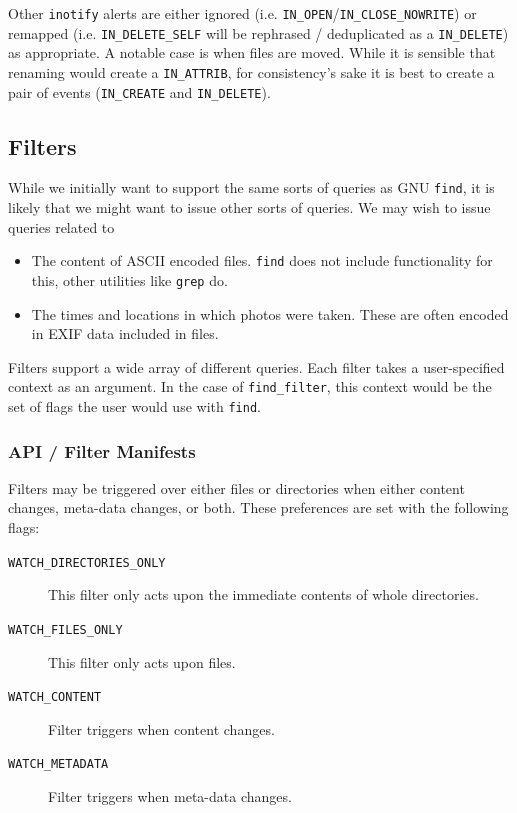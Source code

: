 \documentclass[a4paper]{report}
\newcommand{\inlinecode}{\texttt}
\begin{document}
Other \inlinecode{inotify} alerts are either ignored (i.e. \inlinecode{IN\_OPEN}/\inlinecode{IN\_CLOSE\_NOWRITE}) or remapped (i.e. \inlinecode{IN\_DELETE\_SELF} will be rephrased / deduplicated as a \inlinecode{IN\_DELETE}) as appropriate. A notable case is when files are moved. While it is sensible that renaming would create a \inlinecode{IN\_ATTRIB}, for consistency's sake it is best to create a pair of events (\inlinecode{IN\_CREATE} and \inlinecode{IN\_DELETE}).

\subsection{Filters}

While we initially want to support the same sorts of queries as GNU \inlinecode{find}, it is likely that we might want to issue other sorts of queries. We may wish to issue queries related to
\begin{itemize}
\item The content of ASCII encoded files. \inlinecode{find} does not include functionality for this, other utilities like \inlinecode{grep} do.
\item The times and locations in which photos were taken. These are often encoded in EXIF data included in files.
\end{itemize}

Filters support a wide array of different queries. Each filter takes a user-specified context as an argument. In the case of \inlinecode{find\_filter}, this context would be the set of flags the user would use with \inlinecode{find}.

\subsubsection{API / Filter Manifests}

Filters may be triggered over either files or directories when either content changes, meta-data changes, or both. These preferences are set with the following flags:

\begin{description}
\item[\inlinecode{WATCH\_DIRECTORIES\_ONLY}] This filter only acts upon the immediate contents of whole directories.
\item[\inlinecode{WATCH\_FILES\_ONLY}] This filter only acts upon files.
\item[\inlinecode{WATCH\_CONTENT}] Filter triggers when content changes.
\item[\inlinecode{WATCH\_METADATA}] Filter triggers when meta-data changes.
\end{description}
\end{document}
